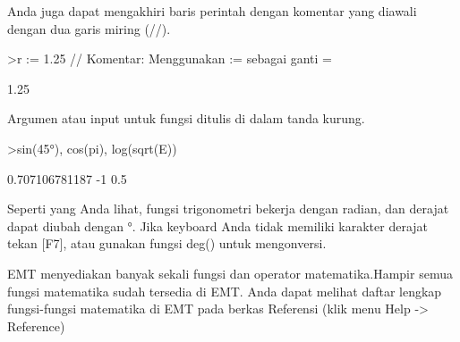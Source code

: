 \begin{eulernotebook}
\begin{eulercomment}
    Anda juga dapat mengakhiri baris perintah dengan komentar yang diawali
    dengan dua garis miring (//).
    \end{eulercomment}
    \begin{eulerprompt}
>r := 1.25 // Komentar: Menggunakan  := sebagai ganti =
    \end{eulerprompt}
    \begin{euleroutput}
  1.25
    \end{euleroutput}
    \begin{eulercomment}
        Argumen atau input untuk fungsi ditulis di dalam tanda kurung.
    \end{eulercomment}
    \begin{eulerprompt}
>sin(45°), cos(pi), log(sqrt(E))
    \end{eulerprompt}
    \begin{euleroutput}
  0.707106781187
  -1
  0.5
    \end{euleroutput}
    \begin{eulercomment}
        Seperti yang Anda lihat, fungsi trigonometri bekerja dengan radian, dan derajat
        dapat diubah dengan °. Jika keyboard Anda tidak memiliki karakter derajat tekan
        [F7], atau gunakan fungsi deg() untuk mengonversi.
        
        EMT menyediakan banyak sekali fungsi dan operator matematika.Hampir semua fungsi
        matematika sudah tersedia di EMT. Anda dapat melihat daftar lengkap fungsi-fungsi
        matematika di EMT pada berkas Referensi (klik menu Help -\textgreater{} Reference)
        

\end{eulercomment}
\end{eulernotebook}
